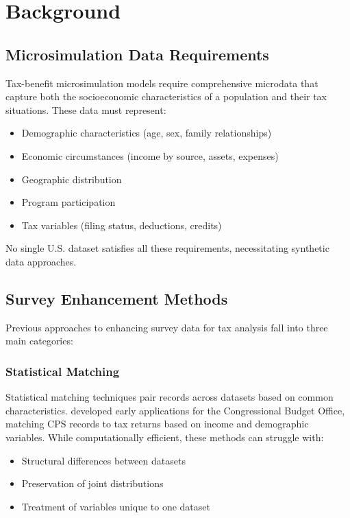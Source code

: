 \section{Background}

\subsection{Microsimulation Data Requirements}

Tax-benefit microsimulation models require comprehensive microdata that capture both the socioeconomic characteristics of a population and their tax situations. These data must represent:
\begin{itemize}
    \item Demographic characteristics (age, sex, family relationships)
    \item Economic circumstances (income by source, assets, expenses)
    \item Geographic distribution
    \item Program participation
    \item Tax variables (filing status, deductions, credits)
\end{itemize}

No single U.S. dataset satisfies all these requirements, necessitating synthetic data approaches.

\subsection{Survey Enhancement Methods}

Previous approaches to enhancing survey data for tax analysis fall into three main categories:

\subsubsection{Statistical Matching}

Statistical matching techniques pair records across datasets based on common characteristics. \cite{SmithWeiss1988} developed early applications for the Congressional Budget Office, matching CPS records to tax returns based on income and demographic variables. While computationally efficient, these methods can struggle with:
\begin{itemize}
    \item Structural differences between datasets
    \item Preservation of joint distributions
    \item Treatment of variables unique to one dataset
\end{itemize}

